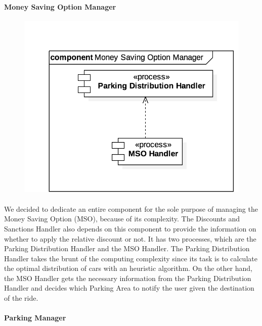 		\paragraph{Money Saving Option Manager}
			\begin{figure}[h]
				\includegraphics[scale=0.4, center]{img/component_diagrams/09_money_saving_option_manager.png}
			\end{figure}
		
		\paragraph{} We decided to dedicate an entire component for the sole purpose of managing the Money Saving Option (MSO), because of its complexity. The Discounts and Sanctions Handler also depends on this component to provide the information on whether to apply the relative discount or not. It has two processes, which are the Parking Distribution Handler and the MSO Handler. The Parking Distribution Handler takes the brunt of the computing complexity since its task is to calculate the optimal distribution of cars with an heuristic algorithm. On the other hand, the MSO Handler gets the necessary information from the Parking Distribution Handler and decides which Parking Area to notify the user given the destination of the ride.
\FloatBarrier		
		
		\paragraph{Parking Manager}
		
